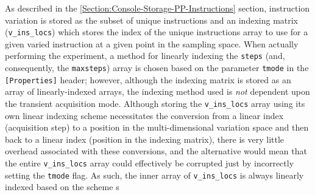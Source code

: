 \documentclass[PaulGanssle-Thesis.tex]{subfiles}
\begin{document}
As described in the \ref{Section:Console-Storage-PP-Instructions} section, instruction variation is stored as the subset of unique instructions and an indexing matrix (\verb|v_ins_locs|) which stores the index of the unique instructions array to use for a given varied instruction at a given point in the sampling space. When actually performing the experiment, a method for linearly indexing the \texttt{steps} (and, consequently, the \texttt{maxsteps}) array is chosen based on the parameter \texttt{tmode} in the \texttt{[Properties]} header; however, although the indexing matrix is stored as an array of linearly-indexed arrays, the indexing method used is \textit{not} dependent upon the transient acquisition mode. Although storing the \verb|v_ins_locs| array using its own linear indexing scheme necessitates the conversion from a linear index (acquisition step) to a position in the multi-dimensional variation space and then back to a linear index (position in the indexing matrix), there is very little overhead associated with these conversions, and the alternative would mean that the entire \verb|v_ins_locs| array could effectively be corrupted just by incorrectly setting the \texttt{tmode} flag. As such, the inner array of \verb|v_ins_locs| is always linearly indexed based on the scheme s
\end{document}
